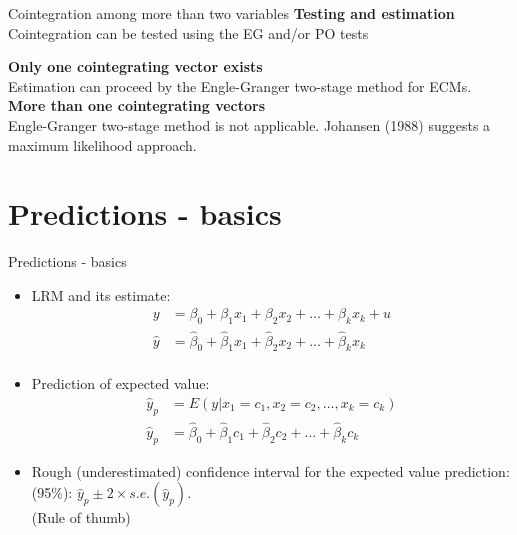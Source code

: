 \documentclass{beamer}
\begin{document}

\begin{frame}{Cointegration among more than two variables}
\textbf{Testing and estimation}\\
Cointegration can be tested using the EG and/or PO tests

\hspace{0.3cm}

\textbf{Only one cointegrating vector exists}\\
Estimation can proceed by the Engle-Granger two-stage method for ECMs. \\ 
\vspace{0.3cm}
\textbf{More than one cointegrating vectors}\\
Engle-Granger two-stage method is not applicable. Johansen (1988) suggests a maximum likelihood approach. 
\end{frame}


\section{Predictions - basics}

\begin{frame}{Predictions - basics}
\begin{itemize}
\item LRM and its estimate:
\begin{align}\nonumber
y & = \beta_0 + \beta_1 x_1 +\beta_2 x_2 + \dots + \beta_k x_k + u\\ \nonumber
\hat{y} & = \hat{\beta}_0 + \hat{\beta}_1 x_1 +\hat{\beta}_2 x_2 + \dots + \hat{\beta}_k x_k \\ \nonumber
\end{align}
\item Prediction of expected value: 
\begin{align}\nonumber
\hat{y}_p & = E(y|x_1 = c_1, x_2 = c_2,\dots,x_k = c_k)\\ \nonumber
\hat{y}_p & = \hat{\beta}_0 + \hat{\beta}_1 c_1 +\hat{\beta}_2 c_2 + \dots + \hat{\beta}_k c_k  \nonumber
\end{align}
\item Rough (underestimated) confidence interval for the expected value prediction: (95\%): $\hat{y}_p \pm 2 \times \textit{s.e.}(\hat{y}_p)$. \\ (Rule of thumb) 
\end{itemize}
\end{frame}
\end{document}

